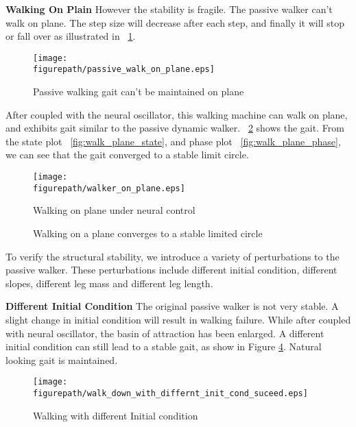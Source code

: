 \textbf{Walking On Plain}
However the stability is fragile.  
The passive walker can't walk on plane. 
The step size will decrease after each step, and finally it will stop or fall over as illustrated in \figurename ~\ref{fig:pass_waling_on_plane}.
\begin{figure}[!h]
\centering
\texttt{[image: \\figurepath/passive\_walk\_on\_plane.eps]}
\caption{Passive walking gait can't be maintained on plane}
\label{fig:pass_waling_on_plane}
\end{figure}

After coupled with the neural oscillator, this walking machine can walk on plane, and exhibits gait similar to the passive dynamic walker. 
\figurename ~\ref{fig:walk_plane} shows the gait. 
From the state plot \figurename ~\ref{fig:walk_plane_state}, and phase plot \figurename ~\ref{fig:walk_plane_phase}, we can see that the gait converged to a stable limit circle.


\begin{figure}[!h]
\centering
\texttt{[image: \\figurepath/walker\_on\_plane.eps]}
\caption{Walking on plane under neural control}
\label{fig:walk_plane}
\end{figure}


\begin{figure}[!h]
\centerline{
\hfill
{}
}
\caption{
Walking on a plane converges to a stable limited circle
}
\label{fig:walk_on_plane}
\end{figure}

To verify the structural stability, we introduce a variety of perturbations to the passive walker. 
These perturbations include different initial condition, different slopes, different leg mass and different leg length.

\textbf{Different Initial Condition}
The original passive walker is not very stable. 
A slight change in initial condition will result in walking failure. 
While after coupled with neural oscillator, the basin of attraction has been enlarged. 
A different initial condition can still lead to a stable gait, as show in Figure \ref{fig:diff_init}. 
Natural looking gait is maintained.
\begin{figure}[h]
\centering
\texttt{[image: \\figurepath/walk\_down\_with\_differnt\_init\_cond\_suceed.eps]}
\caption
{
Walking with different Initial condition
}
\label{fig:diff_init}
\end{figure}
 


